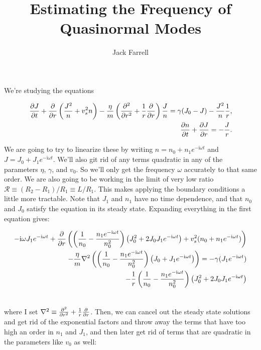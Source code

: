 \documentclass[12pt]{article}
\title{Estimating the Frequency of Quasinormal Modes}
\author{Jack Farrell}
\begin{document}
	\maketitle
	We're studying the equations
	
	\begin{equation}
	\label{eq:mainEquation}
	\begin{aligned}[c]
	\pdv{J}{t} + \pdv{r}\left(\frac{J^2}{n} + v_s^2 n \right) -\frac{\eta}{m} \left(\pdv[2]{r} + \frac{1}{r}\pdv{r}\right)\frac{J}{n} = \gamma (J_0 - J) - \frac{J^2}{n} \frac{1}{r},  \\
	\pdv{n}{t} + \pdv{J}{r} = -\frac{J}{r}. \\
	\end{aligned}
	\end{equation}
	
	We are going to try to linearize these by writing $n = n_0 + n_1 e^{-\mathrm{i} \omega t}$ and $J = J_0 + J_1 e^{-\mathrm{i} \omega t}$.  We'll also git rid of any terms quadratic in any of the parameters $\eta$, $\gamma$, and $v_0$. So we'll only get the frequency $\omega$ accurately to that same order. We are also going to be working in the limit of very low ratio $\mathcal{R} \equiv (R_2 - R_1) / R_1 \equiv L / R_1$.  This makes applying the boundary conditions a little more tractable.  Note that $J_1$ and $n_1$ have no time dependence, and that $n_0$ and $J_0$ satisfy the equation in its steady state.  Expanding everything in the first equation gives:
	
	\begin{align*}
	-\mathrm{i}\omega J_1 e^{-\mathrm{i}\omega t} + \pdv{r}\left(\left(\frac{1}{n_0} - \frac{n_1e^{-\mathrm{i}\omega t}}{n_0^2}\right) \left(J_0^2 + 2 J_0J_1e^{-\mathrm{i}\omega t}\right) + v_s^2 (n_0 + n_1e^{-\mathrm{i}\omega t})\right)\\\nonumber - \frac{\eta}{m}\laplacian \left(\left( \frac{1}{n_0}  -  \frac{n_1e^{-\mathrm{i}\omega t}}{n_0^2}\right)\left(J_0 + J_1e^{-\mathrm{i}\omega t} \right) \right) = -\gamma (J_1e^{-\mathrm{i}\omega t})  \\\nonumber- \frac{1}{r}\left(\frac{1}{n_0} - \frac{n_1e^{-\mathrm{i}\omega t}}{n_0^2}\right) \left(J_0^2 + 2 J_0J_1e^{-\mathrm{i}\omega t}\right) \\\nonumber
	\end{align*}
	
	where I set $\laplacian \equiv \pdv[2]{r} + \frac{1}{r}\pdv{r}$.  Then, we can cancel out the steady state solutions and get rid of the exponential factors and throw away the terms that have too high an order in $n_1$ and $J_1$, and then later get rid of terms that are quadratic in the parameters like $v_0$ as well:
	
\end{document}
